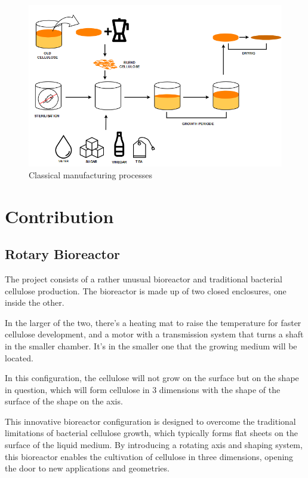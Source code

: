 \begin{figure}[h]
    \centering
    \includegraphics[width=1.2\textwidth]{images/SCOBY_diag.png}
    \caption{Classical manufacturing processes}
    \label{fig:manufacture}
\end{figure} 

\section{Contribution}

\subsection{Rotary Bioreactor}
The project consists of a rather unusual bioreactor and traditional bacterial cellulose production. The bioreactor is made up of two closed enclosures, one inside the other.

In the larger of the two, there's a heating mat to raise the temperature for faster cellulose development, and a motor with a transmission system that turns a shaft in the smaller chamber. It's in the smaller one that the growing medium will be located.

In this configuration, the cellulose will not grow on the surface but on the shape in question, which will form cellulose in 3 dimensions with the shape of the surface of the shape on the axis. 

This innovative bioreactor configuration is designed to overcome the traditional limitations of bacterial cellulose growth, which typically forms flat sheets on the surface of the liquid medium. By introducing a rotating axis and shaping system, this bioreactor enables the cultivation of cellulose in three dimensions, opening the door to new applications and geometries.

